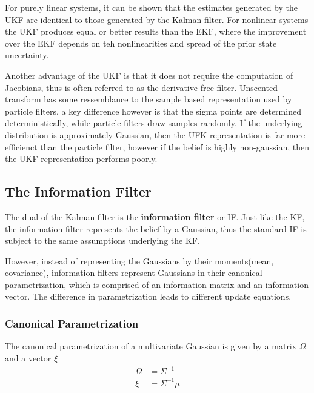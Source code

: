 \documentclass[14pt,letterpaper]{article}
\theoremstyle{definition}
\begin{document}
\vspace{2mm}

For purely linear systems, it can be shown that the estimates generated by the UKF are identical to those generated by the Kalman filter.
For nonlinear systems the UKF produces equal or better results than the EKF, where the improvement over the EKF depends on teh nonlinearities and spread of the prior state uncertainty.

Another advantage of the UKF is that it does not require the computation of Jacobians, thus is often referred to as the derivative-free filter.
Unscented transform has some ressemblance to the sample based representation used by particle filters, a key difference however is that the sigma points are determined deterministically, while particle filters draw samples randomly.
If the underlying distribution is approximately Gaussian, then the UFK representation is far more efficienct than the particle filter, however if the belief is highly non-gaussian, then the UKF representation performs poorly.

\newpage

\subsection{The Information Filter}

The dual of the Kalman filter is the \textbf{information filter} or IF.
Just like the KF, the information filter represents the belief by a Gaussian, thus the standard IF is subject to the same assumptions underlying the KF.

However, instead of representing the Gaussians by their moments(mean, covariance), information filters represent Gaussians in their canonical parametrization, which is comprised of an information matrix and an information vector.
The difference in parametrization leads to different update equations.

\subsubsection{Canonical Parametrization}

The canonical parametrization of a multivariate Gaussian is given by a matrix $ \Omega$ and a vector $\xi$
\begin{align}
  \Omega &= \Sigma^{-1} \\
  \xi &= \Sigma^{-1} \mu \\
\end{align}
\end{document}
